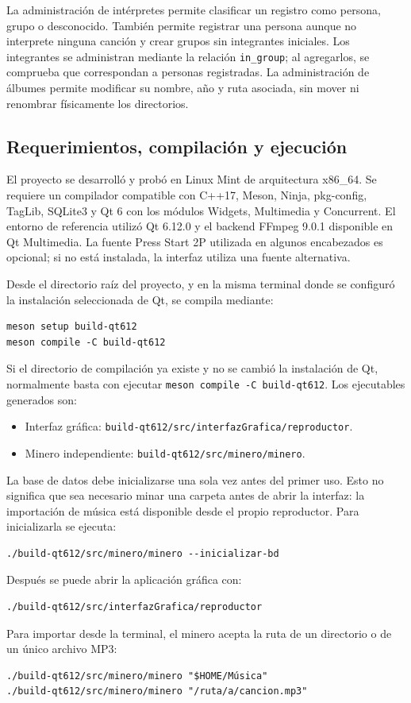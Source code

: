 \documentclass[10pt,a4paper]{article}
\begin{document}
La administración de intérpretes permite clasificar un registro como persona, grupo o desconocido. También permite registrar una persona aunque no interprete ninguna canción y crear grupos sin integrantes iniciales. Los integrantes se administran mediante la relación \texttt{in\_group}; al agregarlos, se comprueba que correspondan a personas registradas. La administración de álbumes permite modificar su nombre, año y ruta asociada, sin mover ni renombrar físicamente los directorios.

\subsection{Requerimientos, compilación y ejecución}
El proyecto se desarrolló y probó en Linux Mint de arquitectura x86\_64. Se requiere un compilador compatible con C++17, Meson, Ninja, pkg-config, TagLib, SQLite3 y Qt 6 con los módulos Widgets, Multimedia y Concurrent. El entorno de referencia utilizó Qt 6.12.0 y el backend FFmpeg 9.0.1 disponible en Qt Multimedia. La fuente Press Start 2P utilizada en algunos encabezados es opcional; si no está instalada, la interfaz utiliza una fuente alternativa.

Desde el directorio raíz del proyecto, y en la misma terminal donde se configuró la instalación seleccionada de Qt, se compila mediante:
\begin{verbatim}
meson setup build-qt612
meson compile -C build-qt612
\end{verbatim}
Si el directorio de compilación ya existe y no se cambió la instalación de Qt, normalmente basta con ejecutar \texttt{meson compile -C build-qt612}. Los ejecutables generados son:
\begin{itemize}
    \item Interfaz gráfica: \texttt{build-qt612/src/interfazGrafica/reproductor}.
    \item Minero independiente: \texttt{build-qt612/src/minero/minero}.
\end{itemize}

La base de datos debe inicializarse una sola vez antes del primer uso. Esto no significa que sea necesario minar una carpeta antes de abrir la interfaz: la importación de música está disponible desde el propio reproductor. Para inicializarla se ejecuta:
\begin{verbatim}
./build-qt612/src/minero/minero --inicializar-bd
\end{verbatim}
Después se puede abrir la aplicación gráfica con:
\begin{verbatim}
./build-qt612/src/interfazGrafica/reproductor
\end{verbatim}
Para importar desde la terminal, el minero acepta la ruta de un directorio o de un único archivo MP3:
\begin{verbatim}
./build-qt612/src/minero/minero "$HOME/Música"
./build-qt612/src/minero/minero "/ruta/a/cancion.mp3"
\end{verbatim}
\end{document}
